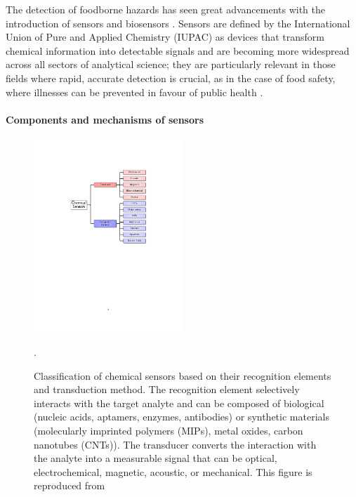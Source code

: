 The detection of foodborne hazards has seen great advancements with the introduction of sensors and biosensors \citep{guRecent2022,liResearch2022}. Sensors are defined by the International Union of Pure and Applied Chemistry (IUPAC) as devices that transform chemical information into detectable signals \citep{hulanickiChemical1991} and are becoming more widespread across all sectors of analytical science; they are particularly relevant in those fields where rapid, accurate detection is crucial, as in the case of food safety, where illnesses can be prevented in favour of public health \citep{payneSensors1983, javaidSensors2021, baranwalElectrochemical2022}.

\paragraph{Components and mechanisms of sensors}
\begin{figure}[ht]
	\centering
	\includegraphics[width=0.5\textwidth]{figures/chapter1/sensors/Fig2_SensorClass.pdf}
	\caption{Classification of chemical sensors based on their recognition elements and transduction method. The recognition element selectively interacts with the target analyte and can be composed of biological (nucleic acids, aptamers, enzymes, antibodies) or synthetic materials (molecularly imprinted polymers (MIPs), metal oxides, carbon nanotubes (CNTs)). The transducer converts the interaction with the analyte into a measurable signal that can be optical, electrochemical, magnetic, acoustic, or mechanical. This figure is reproduced from }.
	\label{fig:sensorClass}
\end{figure}


